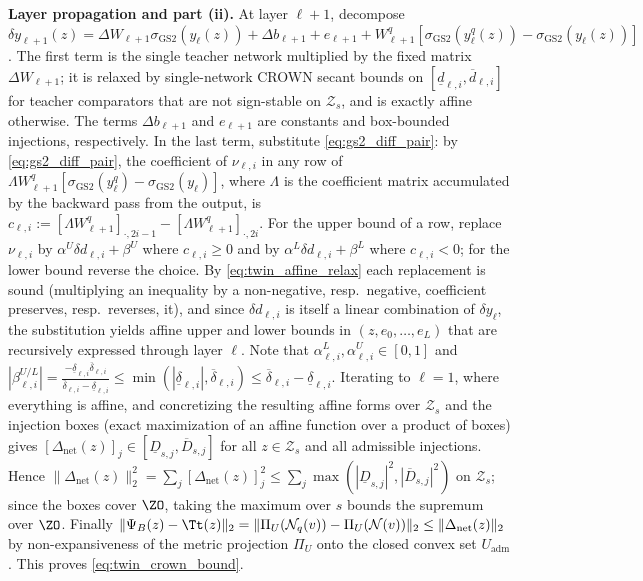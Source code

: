 \textbf{Layer propagation and part (ii).} At layer \(\ell+1\), decompose
\(\delta y_{\ell+1}(z) = \Delta W_{\ell+1}\sigma_{\mathrm{GS2}}(y_\ell(z)) + \Delta b_{\ell+1} + e_{\ell+1} + W_{\ell+1}^q [\sigma_{\mathrm{GS2}}(y_\ell^q(z)) - \sigma_{\mathrm{GS2}}(y_\ell(z))]\). The first term is the single teacher network multiplied by the fixed matrix \(\Delta W_{\ell+1}\); it is relaxed by single-network CROWN secant bounds on \([\underline{d}_{\ell,i}, \overline{d}_{\ell,i}]\) for teacher comparators that are not sign-stable on \(\mathcal{Z}_s\), and is exactly affine otherwise. The terms \(\Delta b_{\ell+1}\) and \(e_{\ell+1}\) are constants and box-bounded injections, respectively. In the last term, substitute \eqref{eq:gs2_diff_pair}: by \eqref{eq:gs2_diff_pair}, the coefficient of \(\nu_{\ell,i}\) in any row of \(\Lambda W_{\ell+1}^q[\sigma_{\mathrm{GS2}}(y^q_\ell) - \sigma_{\mathrm{GS2}}(y_\ell)]\), where \(\Lambda\) is the coefficient matrix accumulated by the backward pass from the output, is \(c_{\ell,i} := [\Lambda W^q_{\ell+1}]_{\cdot,2i-1} - [\Lambda W^q_{\ell+1}]_{\cdot,2i}\). For the upper bound of a row, replace \(\nu_{\ell,i}\) by \(\alpha^U\delta d_{\ell,i} + \beta^U\) where \(c_{\ell,i} \ge 0\) and by \(\alpha^L\delta d_{\ell,i} + \beta^L\) where \(c_{\ell,i} < 0\); for the lower bound reverse the choice. By \eqref{eq:twin_affine_relax} each replacement is sound (multiplying an inequality by a non-negative, resp.\ negative, coefficient preserves, resp.\ reverses, it), and since \(\delta d_{\ell,i}\) is itself a linear combination of \(\delta y_\ell\), the substitution yields affine upper and lower bounds in \((z, e_0, \dots, e_L)\) that are recursively expressed through layer \(\ell\). Note that \(\alpha_{\ell,i}^L, \alpha_{\ell,i}^U \in [0, 1]\) and \(|\beta_{\ell,i}^{U/L}| = \frac{-\underline{\delta}_{\ell,i}\overline{\delta}_{\ell,i}}{\overline{\delta}_{\ell,i} - \underline{\delta}_{\ell,i}} \le \min(|\underline{\delta}_{\ell,i}|, \overline{\delta}_{\ell,i}) \le \overline{\delta}_{\ell,i} - \underline{\delta}_{\ell,i}\). Iterating to \(\ell = 1\), where everything is affine, and concretizing the resulting affine forms over \(\mathcal{Z}_s\) and the injection boxes (exact maximization of an affine function over a product of boxes) gives \([\Delta_{\mathrm{net}}(z)]_j \in [\underline{D}_{s,j}, \overline{D}_{s,j}]\) for all \(z \in \mathcal{Z}_s\) and all admissible injections. Hence \(\|\Delta_{\mathrm{net}}(z)\|_2^2 = \sum_j [\Delta_{\mathrm{net}}(z)]_j^2 \le \sum_j \max(|\underline{D}_{s,j}|^2, |\overline{D}_{s,j}|^2)\) on \(\mathcal{Z}_s\); since the boxes cover \(\ZO\), taking the maximum over \(s\) bounds the supremum over \(\ZO\). Finally \(\|\Psi_B(z) - \Tt(z)\|_2 = \|\Pi_U(\mathcal{N}_q(v)) - \Pi_U(\mathcal{N}(v))\|_2 \le \|\Delta_{\mathrm{net}}(z)\|_2\) by non-expansiveness of the metric projection \(\Pi_U\) onto the closed convex set \(U_{\mathrm{adm}}\). This proves \eqref{eq:twin_crown_bound}.


